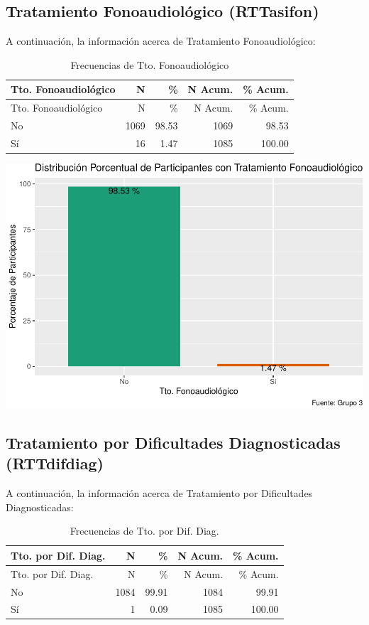 \documentclass[
]{article}
\begin{document}
\subsection{Tratamiento Fonoaudiológico
(RTTasifon)}\label{tratamiento-fonoaudioluxf3gico-rttasifon}

A continuación, la información acerca de Tratamiento Fonoaudiológico:

\begin{longtable}[]{@{}lrrrr@{}}
\caption{Frecuencias de Tto. Fonoaudiológico}\tabularnewline
\toprule\noalign{}
Tto. Fonoaudiológico & N & \% & N Acum. & \% Acum. \\
\midrule\noalign{}
\endfirsthead
\toprule\noalign{}
Tto. Fonoaudiológico & N & \% & N Acum. & \% Acum. \\
\midrule\noalign{}
\endhead
\bottomrule\noalign{}
\endlastfoot
No & 1069 & 98.53 & 1069 & 98.53 \\
Sí & 16 & 1.47 & 1085 & 100.00 \\
\end{longtable}

\includegraphics{Info_Dinix_02_files/figure-latex/30_RTTasifon-1.pdf}

\subsection{Tratamiento por Dificultades Diagnosticadas
(RTTdifdiag)}\label{tratamiento-por-dificultades-diagnosticadas-rttdifdiag}

A continuación, la información acerca de Tratamiento por Dificultades
Diagnosticadas:

\begin{longtable}[]{@{}lrrrr@{}}
\caption{Frecuencias de Tto. por Dif. Diag.}\tabularnewline
\toprule\noalign{}
Tto. por Dif. Diag. & N & \% & N Acum. & \% Acum. \\
\midrule\noalign{}
\endfirsthead
\toprule\noalign{}
Tto. por Dif. Diag. & N & \% & N Acum. & \% Acum. \\
\midrule\noalign{}
\endhead
\bottomrule\noalign{}
\endlastfoot
No & 1084 & 99.91 & 1084 & 99.91 \\
Sí & 1 & 0.09 & 1085 & 100.00 \\
\end{longtable}
\end{document}
